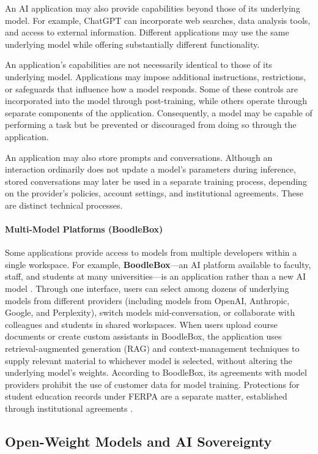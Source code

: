 \documentclass[11pt]{article}
\begin{document}
An AI application may also provide capabilities beyond those of its underlying model. For example, ChatGPT can incorporate web searches, data analysis tools, and access to external information. Different applications may use the same underlying model while offering substantially different functionality.

An application's capabilities are not necessarily identical to those of its underlying model. Applications may impose additional instructions, restrictions, or safeguards that influence how a model responds. Some of these controls are incorporated into the model through post-training, while others operate through separate components of the application. Consequently, a model may be capable of performing a task but be prevented or discouraged from doing so through the application.

An application may also store prompts and conversations. Although an
interaction ordinarily does not update a model's parameters during
inference, stored conversations may later be used in a separate training
process, depending on the provider's policies, account settings, and
institutional agreements. These are distinct technical processes.

\paragraph{Multi-Model Platforms (BoodleBox)}
Some applications provide access to models from multiple developers within a single workspace.
For example, \textbf{BoodleBox}---an AI platform available to faculty, staff, and students at many universities---is an application rather than a new AI model \citep{BoodleBox2026}.
Through one interface, users can select among dozens of underlying models from different providers
(including models from OpenAI, Anthropic, Google, and Perplexity),
switch models mid-conversation, or collaborate with colleagues and students in shared workspaces. When users upload course documents or create custom assistants in BoodleBox, the application uses retrieval-augmented generation (RAG) and context-management techniques to supply relevant material to whichever model is selected, without altering the underlying model's weights. According to BoodleBox, its agreements with model providers prohibit the use of customer data for model training. Protections for student education records under FERPA are a separate matter, established through institutional agreements \citep{BoodleBox2026}.

\subsection{Open-Weight Models and AI Sovereignty}
\end{document}
